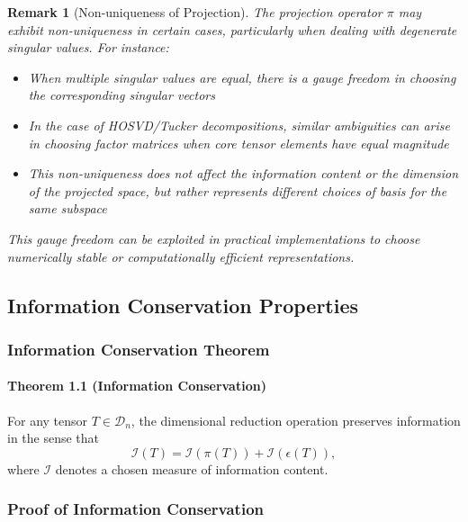 \documentclass[sn-mathphys-num]{sn-jnl}
\theoremstyle{thmstyleone}
\theoremstyle{thmstyletwo}
\newtheorem{remark}{Remark}
\theoremstyle{thmstylethree}
\begin{document}
\begin{remark}[Non-uniqueness of Projection]
The projection operator $\pi$ may exhibit non-uniqueness in certain cases, particularly when dealing with degenerate singular values. For instance:
\begin{itemize}
    \item When multiple singular values are equal, there is a gauge freedom in choosing the corresponding singular vectors
    \item In the case of HOSVD/Tucker decompositions, similar ambiguities can arise in choosing factor matrices when core tensor elements have equal magnitude
    \item This non-uniqueness does not affect the information content or the dimension of the projected space, but rather represents different choices of basis for the same subspace
\end{itemize}
This gauge freedom can be exploited in practical implementations to choose numerically stable or computationally efficient representations.
\end{remark}

\subsection{Information Conservation Properties}
\subsubsection{Information Conservation Theorem}
\paragraph{Theorem 1.1 (Information Conservation)}
For any tensor $T \in \mathcal{D}_n$, the dimensional reduction operation preserves 
information in the sense that
\[
\mathcal{I}(T) = \mathcal{I}(\pi(T)) + \mathcal{I}(\epsilon(T)),
\]
where $\mathcal{I}$ denotes a chosen measure of information content.

\subsubsection{Proof of Information Conservation}
\end{document}
